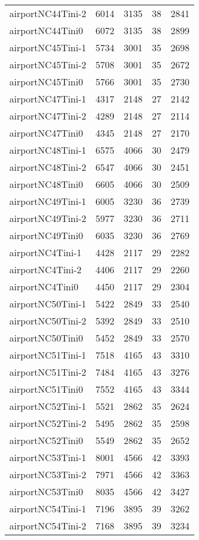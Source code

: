 \begin{longtable}{lrrrr}
airportNC44Tini-2 & 6014 & 3135 & 38 & 2841 \\
airportNC44Tini0 & 6072 & 3135 & 38 & 2899 \\
airportNC45Tini-1 & 5734 & 3001 & 35 & 2698 \\
airportNC45Tini-2 & 5708 & 3001 & 35 & 2672 \\
airportNC45Tini0 & 5766 & 3001 & 35 & 2730 \\
airportNC47Tini-1 & 4317 & 2148 & 27 & 2142 \\
airportNC47Tini-2 & 4289 & 2148 & 27 & 2114 \\
airportNC47Tini0 & 4345 & 2148 & 27 & 2170 \\
airportNC48Tini-1 & 6575 & 4066 & 30 & 2479 \\
airportNC48Tini-2 & 6547 & 4066 & 30 & 2451 \\
airportNC48Tini0 & 6605 & 4066 & 30 & 2509 \\
airportNC49Tini-1 & 6005 & 3230 & 36 & 2739 \\
airportNC49Tini-2 & 5977 & 3230 & 36 & 2711 \\
airportNC49Tini0 & 6035 & 3230 & 36 & 2769 \\
airportNC4Tini-1 & 4428 & 2117 & 29 & 2282 \\
airportNC4Tini-2 & 4406 & 2117 & 29 & 2260 \\
airportNC4Tini0 & 4450 & 2117 & 29 & 2304 \\
airportNC50Tini-1 & 5422 & 2849 & 33 & 2540 \\
airportNC50Tini-2 & 5392 & 2849 & 33 & 2510 \\
airportNC50Tini0 & 5452 & 2849 & 33 & 2570 \\
airportNC51Tini-1 & 7518 & 4165 & 43 & 3310 \\
airportNC51Tini-2 & 7484 & 4165 & 43 & 3276 \\
airportNC51Tini0 & 7552 & 4165 & 43 & 3344 \\
airportNC52Tini-1 & 5521 & 2862 & 35 & 2624 \\
airportNC52Tini-2 & 5495 & 2862 & 35 & 2598 \\
airportNC52Tini0 & 5549 & 2862 & 35 & 2652 \\
airportNC53Tini-1 & 8001 & 4566 & 42 & 3393 \\
airportNC53Tini-2 & 7971 & 4566 & 42 & 3363 \\
airportNC53Tini0 & 8035 & 4566 & 42 & 3427 \\
airportNC54Tini-1 & 7196 & 3895 & 39 & 3262 \\
airportNC54Tini-2 & 7168 & 3895 & 39 & 3234 \\

\end{longtable}
